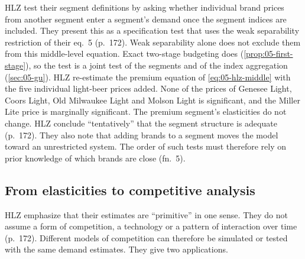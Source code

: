 HLZ test their segment definitions by asking whether individual brand prices from another segment enter a
segment's demand once the segment indices are included. They present this as a specification test that uses the
weak separability restriction of their eq.~5 (p.~172). Weak separability alone does not exclude them from this middle-level equation. Exact two-stage
budgeting does (\cref{prop:05-first-stage}), so the test is a joint test of the segments and of the index
aggregation (\cref{sec:05-gu}). HLZ re-estimate the premium equation of
\eqref{eq:05-hlz-middle} with the five individual light-beer prices added. None of the prices of Genesee Light,
Coors Light, Old Milwaukee Light and Molson Light is significant, and the Miller Lite price is marginally
significant. The premium segment's elasticities do not change. HLZ conclude ``tentatively'' that the segment
structure is adequate (p.~172). They also note that adding brands to a segment moves the model toward an
unrestricted system. The order of such tests must therefore rely on prior knowledge of which brands are close
(fn.~5).

\subsection{From elasticities to competitive analysis}\label{sec:05-hlz-antitrust}

HLZ emphasize that their estimates are ``primitive'' in one sense. They do not assume a form of competition, a
technology or a pattern of interaction over time (p.~172). Different models of competition can therefore be
simulated or tested with the same demand estimates. They give two applications.

